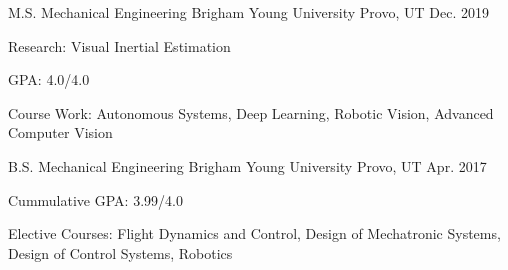 

\begin{cventries}

  \cventry
    {M.S. Mechanical Engineering} %
    {Brigham Young University} %
    {Provo, UT} %
    {Dec. 2019} %
    {
      \begin{cvitems} %
        \item {Research: Visual Inertial Estimation}
        \item {GPA: 4.0/4.0}
        \item {Course Work: Autonomous Systems, Deep Learning, Robotic Vision,
          Advanced Computer Vision}
      \end{cvitems}
    }

  \cventry
    {B.S. Mechanical Engineering} %
    {Brigham Young University} %
    {Provo, UT} %
    {Apr. 2017} %
    {
      \begin{cvitems} %
        \item {Cummulative GPA: 3.99/4.0}
        \item {Elective Courses: Flight Dynamics and Control, Design of
          Mechatronic Systems, Design of Control Systems, Robotics}
      \end{cvitems}
    }

\end{cventries}
